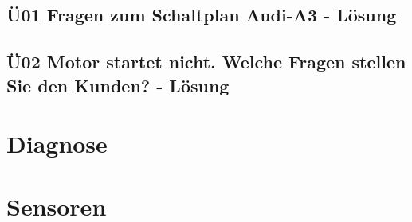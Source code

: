 \section{Ü01 Fragen zum Schaltplan Audi-A3 - Lösung}

\section{Ü02 Motor startet nicht. Welche Fragen stellen Sie den Kunden? - Lösung}




\chapter{Diagnose}

\chapter{Sensoren}






%
%



%



